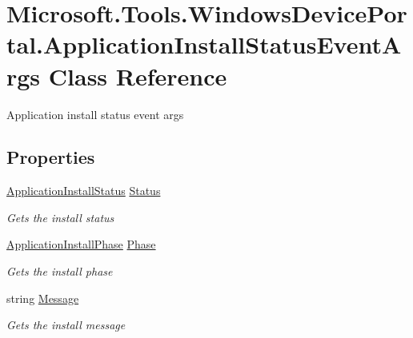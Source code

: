 \hypertarget{class_microsoft_1_1_tools_1_1_windows_device_portal_1_1_application_install_status_event_args}{}\section{Microsoft.\+Tools.\+Windows\+Device\+Portal.\+Application\+Install\+Status\+Event\+Args Class Reference}
\label{class_microsoft_1_1_tools_1_1_windows_device_portal_1_1_application_install_status_event_args}


Application install status event args  


\subsection*{Properties}
\begin{DoxyCompactItemize}
\item 
\hyperlink{namespace_microsoft_1_1_tools_1_1_windows_device_portal_a6d809b60c74a8dfeca3698554f0afb6d}{Application\+Install\+Status} \hyperlink{class_microsoft_1_1_tools_1_1_windows_device_portal_1_1_application_install_status_event_args_af184dcd51a0bfe8cdc2464c9422afa8e}{Status}
\begin{DoxyCompactList}\small\item\em Gets the install status \end{DoxyCompactList}\item 
\hyperlink{namespace_microsoft_1_1_tools_1_1_windows_device_portal_ae5c648e462b3bc9051abfc39ceeb4b69}{Application\+Install\+Phase} \hyperlink{class_microsoft_1_1_tools_1_1_windows_device_portal_1_1_application_install_status_event_args_a977dbc517cfa2fa93eba5c5c752bc46e}{Phase}
\begin{DoxyCompactList}\small\item\em Gets the install phase \end{DoxyCompactList}\item 
string \hyperlink{class_microsoft_1_1_tools_1_1_windows_device_portal_1_1_application_install_status_event_args_a4ed357f77687eb9ad47a17e0b3952c5e}{Message}
\begin{DoxyCompactList}\small\item\em Gets the install message \end{DoxyCompactList}\end{DoxyCompactItemize}


